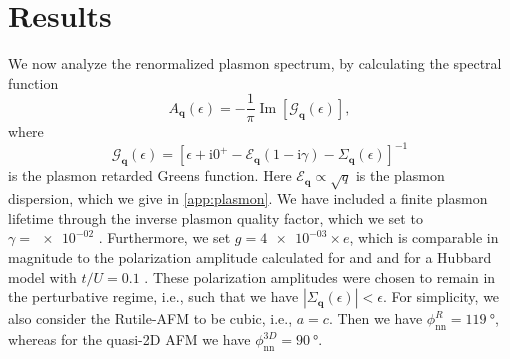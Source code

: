 \documentclass[aps,prb,reprint,twocolumns,superscriptaddress,nofootinbib]{revtex4-2}
\newcommand{\ii}{\mathrm{i}}
\renewcommand{\Im}{\operatorname{Im}}
\newcommand{\gpolarizationrutile}{\num{4e-03}}
\newcommand{\gammaplasmon}{\num{e-02}}
\begin{document}
	\section{Results}
	\label{sec:results}
	We now analyze the renormalized plasmon spectrum, by calculating the spectral function \cite{stoofUltracoldQuantumFields2009}
	\begin{equation}
		A_{\bm q}(\epsilon) = -\frac{1}{\pi}\Im[\mathcal G_{\bm q}(\epsilon)],
	\end{equation}
	where 
	\begin{equation}
		\mathcal G_{\bm q}(\epsilon) = \left[\epsilon + \ii 0^+ - \mathcal{E}_{\bm q}(1-\ii\gamma) - \Sigma_{\bm q}(\epsilon) \right]^{-1}
	\end{equation}
	is the plasmon retarded Greens function. Here $\mathcal E_{\bm q}\propto\sqrt{q}$ is the plasmon dispersion, which we give in \cref{app:plasmon}. We have included a finite plasmon lifetime through the inverse plasmon quality factor, which we set to $\gamma=\gammaplasmon$ \cite{principiIntrinsicLifetimeDirac2013}. 
	Furthermore, we set $g=\gpolarizationrutile\times e$, which is comparable in magnitude to the polarization amplitude calculated for  \cite{seifertOpticalExcitationMagnons2019} and  \cite{mostovoyTemperatureDependentMagnetoelectricEffect2010} and for a Hubbard model with $t/U=0.1$ \cite{zhuSpinorbitCouplingElectronic2014}. These polarization amplitudes were chosen to remain in the perturbative regime, i.e., such that we have $|\Sigma_{\bm q}(\epsilon)|<\epsilon$. For simplicity, we also consider the Rutile-AFM to  be cubic, i.e., $a=c$. Then we have $\phi_{\mathrm{nn}}^{R}=\SI{119}{\degree}$, whereas for the quasi-2D AFM we have $\phi_{\mathrm{nn}}^{3D}=\SI{90}{\degree}$.
	
\end{document}
